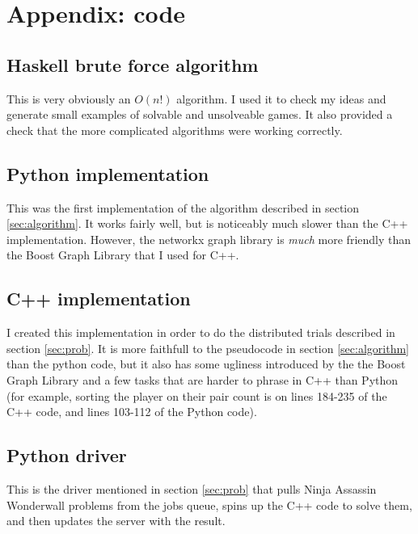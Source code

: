 \documentclass[12pt]{article}
\begin{document}
\section{Appendix: code}
    \renewcommand{\ttdefault}{pcr}
    \subsection{Haskell brute force algorithm}
        This is very obviously an $O(n!)$ algorithm. I used it to check my ideas and generate small examples of solvable and unsolveable games. It also provided a check that the more complicated algorithms were working correctly.
        
    \subsection{Python implementation}
        This was the first implementation of the algorithm described in section \ref{sec:algorithm}. It works fairly well, but is noticeably much slower than the C++ implementation. However, the networkx graph library is \emph{much} more friendly than the Boost Graph Library that I used for C++.
        
    \subsection{C++ implementation}
        I created this implementation in order to do the distributed trials described in section \ref{sec:prob}. It is more faithfull to the pseudocode in section \ref{sec:algorithm} than the python code, but it also has some ugliness introduced by the the Boost Graph Library and a few tasks that are harder to phrase in C++ than Python (for example, sorting the player on their pair count is on lines 184-235 of the C++ code, and lines 103-112 of the Python code).
        
    \subsection{Python driver}
        This is the driver mentioned in section \ref{sec:prob} that pulls Ninja Assassin Wonderwall problems from the jobs queue, spins up the C++ code to solve them, and then updates the server with the result.
        
\end{document}
